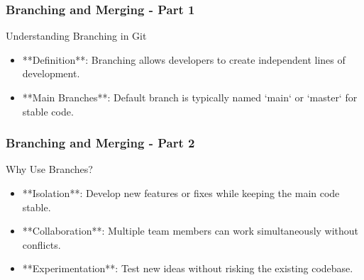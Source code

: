 \documentclass{beamer}
\begin{document}
\begin{frame}[fragile]
    \frametitle{Branching and Merging - Part 1}

    \begin{block}{Understanding Branching in Git}
        \begin{itemize}
            \item **Definition**: Branching allows developers to create independent lines of development.
            \item **Main Branches**: Default branch is typically named `main` or `master` for stable code.
        \end{itemize}
    \end{block}
    
\end{frame}

\begin{frame}[fragile]
    \frametitle{Branching and Merging - Part 2}

    \begin{block}{Why Use Branches?}
        \begin{itemize}
            \item **Isolation**: Develop new features or fixes while keeping the main code stable.
            \item **Collaboration**: Multiple team members can work simultaneously without conflicts.
            \item **Experimentation**: Test new ideas without risking the existing codebase.
        \end{itemize}
    \end{block}

\end{frame}
\end{document}
